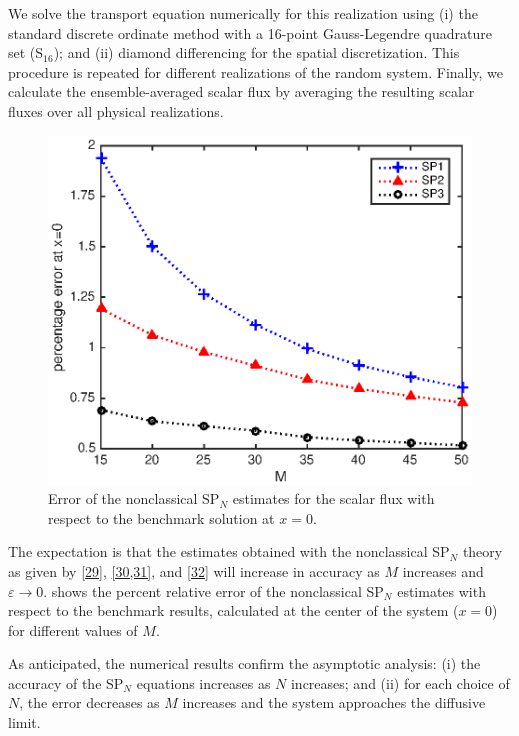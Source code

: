 \documentclass{anstrans}
\newcommand{\ep}{\varepsilon}
\begin{document}
We solve the transport equation numerically for this realization using (i) the standard discrete ordinate method with a 16-point Gauss-Legendre quadrature set (S$_{16}$); and (ii) diamond differencing for the spatial discretization.
This procedure is repeated for different realizations of the random system.
Finally, we calculate the ensemble-averaged scalar flux by averaging the resulting scalar fluxes over all physical realizations.
\begin{figure}[ht] %
  \centering
  \includegraphics[scale=0.75]{fig_spn}
  \caption{Error of the nonclassical SP$_N$ estimates for the scalar flux with respect to the benchmark solution at $x=0$.}
  \label{fig}
\end{figure}

The expectation is that the estimates obtained with the nonclassical SP$_N$ theory as given by \cref{29}, \cref{30,31}, and \cref{32} will increase in accuracy as $M$ increases and $\ep\rightarrow 0$.
 shows the percent relative error of the nonclassical SP$_N$ estimates with respect to the benchmark results, calculated at the center of the system ($x=0$) for different values of $M$. 

As anticipated, the numerical results confirm the asymptotic analysis: (i) the accuracy of the SP$_N$ equations increases as $N$ increases; and (ii) for each choice of $N$, the error decreases as $M$ increases and the system approaches the diffusive limit.

\end{document}

